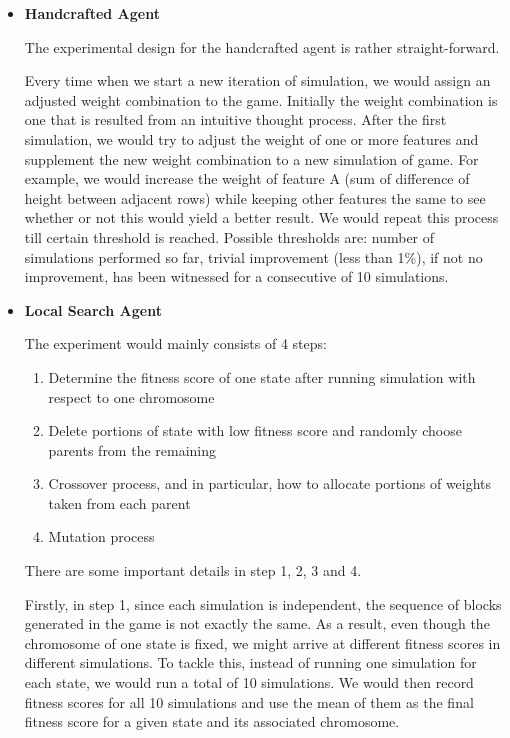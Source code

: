 \documentclass[letterpaper]{article} %
\begin{document}
\begin{itemize}
  \item \textbf{Handcrafted Agent} 
  
  The experimental design for the handcrafted agent is rather straight-forward. 
  
  Every time when we start a new iteration of simulation, we would assign an adjusted weight combination to the game. Initially the weight combination is one that is resulted from an intuitive thought process. After the first simulation, we would try to adjust the weight of one or more features and supplement the new weight combination to a new simulation of game. For example, we would increase the weight of feature A (sum of difference of height between adjacent rows) while keeping other features the same to see whether or not this would yield a better result. We would repeat this process till certain threshold is reached. Possible thresholds are: number of simulations performed so far, trivial improvement (less than 1\%), if not no improvement, has been witnessed for a consecutive of 10 simulations.

  \item \textbf{Local Search Agent} 
  
  The experiment would mainly consists of 4 steps:
  \begin{enumerate}
      \item Determine the fitness score of one state after running simulation with respect to one chromosome
      \item Delete portions of state with low fitness score and randomly choose parents from the remaining
      \item Crossover process, and in particular, how to allocate portions of weights taken from each parent
      \item Mutation process
  \end{enumerate}
  There are some important details in step 1, 2, 3 and 4.
  
  Firstly, in step 1, since each simulation is independent, the sequence of blocks generated in the game is not exactly the same. As a result, even though the chromosome of one state is fixed, we might arrive at different fitness scores in different simulations. To tackle this, instead of running one simulation for each state, we would run a total of 10 simulations. We would then record fitness scores for all 10 simulations and use the mean of them as the final fitness score for a given state and its associated chromosome.
  

\end{itemize}
\end{document}
